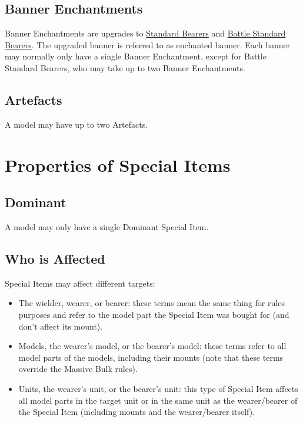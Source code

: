 \subsection{Banner Enchantments}
\label{banner_enchantments}

Banner Enchantments are upgrades to \hyperref[standard_bearer]{Standard Bearers} and \hyperref[bsb]{Battle Standard Bearers}. The upgraded banner is referred to as enchanted banner. Each banner may normally only have a single Banner Enchantment, except for Battle Standard Bearers, who may take up to two Banner Enchantments.

\subsection{Artefacts}
\label{artefacts}

A model may have up to two Artefacts.

\section{Properties of Special Items}

\subsection{Dominant}
\label{dominant}

A model may only have a single Dominant Special Item.

\subsection{Who is Affected}

Special Items may affect different targets:

\begin{itemize}
	\item The wielder, wearer, or bearer: these terms mean the same thing for rules purposes and refer to the model part the Special Item was bought for (and don't affect its mount).
	\item Models, the wearer's model, or the bearer's model: these terms refer to all model parts of the models, including their mounts (note that these terms override the Massive Bulk rules).
	\item Units, the wearer's unit, or the bearer's unit: this type of Special Item affects all model parts in the target unit or in the same unit as the wearer/bearer of the Special Item (including mounts and the wearer/bearer itself).
\end{itemize}

\RBemc
